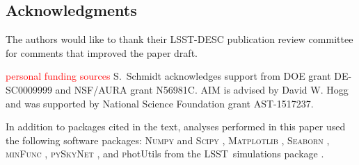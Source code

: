 \documentclass[\docopts]{\docclass}
\newcommand{\proj}[1]{\textsc{#1}}
\newcommand{\lsst}{\proj{LSST}}
\newcommand{\red}[1]{\textcolor{red}{#1}}
\begin{document}









\subsection*{Acknowledgments}






The authors would like to thank their LSST-DESC publication review committee for comments that improved the paper draft.

{ \red{personal funding sources}}
S.~Schmidt acknowledges support from DOE grant DE-SC0009999 and NSF/AURA grant N56981C.
AIM is advised by David W. Hogg and was supported by National Science Foundation grant AST-1517237.

In addition to packages cited in the text, analyses performed in this paper used the following software packages: \textsc{Numpy} and \textsc{Scipy} \citep{numpyscipy}, \textsc{Matplotlib} \citep{matplotlib}, \textsc{Seaborn} \citep{seaborn}, \textsc{minFunc} \citep{minfunc}, \textsc{pySkyNet} \citep{pyskynet}, and {\textsc photUtils} from the \lsst\ simulations package \citep{lsstphotutils}.


\end{document}
